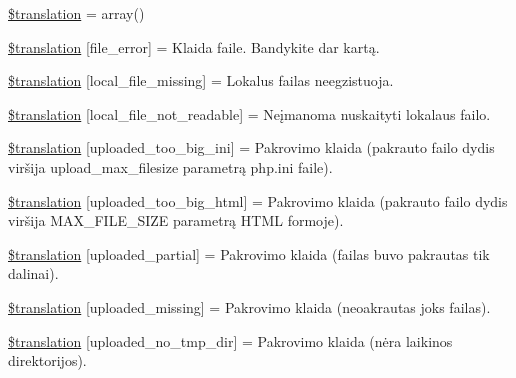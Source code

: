 \begin{DoxyCompactItemize}
\item 
\hyperlink{class_8upload_8lt___l_t_8php_a1f198d410fecc3871ebdd468d343a5e3}{\$translation} = array()
\item 
\hyperlink{class_8upload_8lt___l_t_8php_ac7498e49b9771b04698029aa61c70821}{\$translation} \mbox{[}\textquotesingle{}file\+\_\+error\textquotesingle{}\mbox{]} = \textquotesingle{}Klaida faile. Bandykite dar kartą.\textquotesingle{}
\item 
\hyperlink{class_8upload_8lt___l_t_8php_a6ec3d3a47ab70d77e7aa593e82ead10e}{\$translation} \mbox{[}\textquotesingle{}local\+\_\+file\+\_\+missing\textquotesingle{}\mbox{]} = \textquotesingle{}Lokalus failas neegzistuoja.\textquotesingle{}
\item 
\hyperlink{class_8upload_8lt___l_t_8php_a60104befef9b241f3a7a6a755618a4b3}{\$translation} \mbox{[}\textquotesingle{}local\+\_\+file\+\_\+not\+\_\+readable\textquotesingle{}\mbox{]} = \textquotesingle{}Neįmanoma nuskaityti lokalaus failo.\textquotesingle{}
\item 
\hyperlink{class_8upload_8lt___l_t_8php_a6a08dcd0d3651fdd098568f6b2f0a42c}{\$translation} \mbox{[}\textquotesingle{}uploaded\+\_\+too\+\_\+big\+\_\+ini\textquotesingle{}\mbox{]} = \textquotesingle{}Pakrovimo klaida (pakrauto failo dydis viršija upload\+\_\+max\+\_\+filesize parametrą php.\+ini faile).\textquotesingle{}
\item 
\hyperlink{class_8upload_8lt___l_t_8php_a623d5b8b92169f57d7e43458aa911cbb}{\$translation} \mbox{[}\textquotesingle{}uploaded\+\_\+too\+\_\+big\+\_\+html\textquotesingle{}\mbox{]} = \textquotesingle{}Pakrovimo klaida (pakrauto failo dydis viršija M\+A\+X\+\_\+\+F\+I\+L\+E\+\_\+\+S\+I\+Z\+E parametrą H\+T\+M\+L formoje).\textquotesingle{}
\item 
\hyperlink{class_8upload_8lt___l_t_8php_a967c17da21b0a2d3bd65cca3a9ca0ea8}{\$translation} \mbox{[}\textquotesingle{}uploaded\+\_\+partial\textquotesingle{}\mbox{]} = \textquotesingle{}Pakrovimo klaida (failas buvo pakrautas tik dalinai).\textquotesingle{}
\item 
\hyperlink{class_8upload_8lt___l_t_8php_a0cce433260be65f1f35853a6b4b8952b}{\$translation} \mbox{[}\textquotesingle{}uploaded\+\_\+missing\textquotesingle{}\mbox{]} = \textquotesingle{}Pakrovimo klaida (neoakrautas joks failas).\textquotesingle{}
\item 
\hyperlink{class_8upload_8lt___l_t_8php_ae3cdc68fe248399f77246c91b0555341}{\$translation} \mbox{[}\textquotesingle{}uploaded\+\_\+no\+\_\+tmp\+\_\+dir\textquotesingle{}\mbox{]} = \textquotesingle{}Pakrovimo klaida (nėra laikinos direktorijos).\textquotesingle{}

\end{DoxyCompactItemize}
